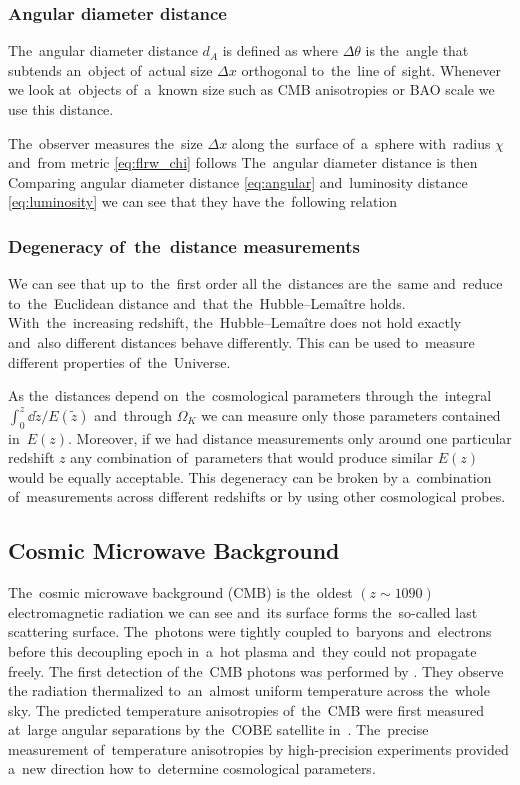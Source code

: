 \subsubsection{Angular diameter distance}
The~angular diameter distance $d_A$ is defined as \parencite{2010deto.book.....A}
where $\Delta\theta$ is the~angle that subtends an~object of~actual size $\Delta x$ orthogonal to~the~line of~sight. Whenever we look at~objects of~a~known size such as CMB anisotropies or BAO scale we use this distance.

The~observer measures the~size $\Delta x$ along the~surface of~a~sphere with~radius $\chi$ and~from metric \eqref{eq:flrw_chi} follows
The~angular diameter distance is then
Comparing angular diameter distance \eqref{eq:angular} and~luminosity distance \eqref{eq:luminosity} we can see that they have the~following relation
\subsubsection{Degeneracy of~the~distance measurements}
We can see that up to~the~first order all the~distances are the~same and~reduce to~the~Euclidean distance and~that the~Hubble--Lema\^{i}tre holds. With~the~increasing redshift, the~Hubble--Lema\^{i}tre does not hold exactly and~also different distances behave differently. This can be used to~measure different properties of~the~Universe.

As the~distances depend on~the~cosmological parameters through the~integral $\int_0^z{\dd\tilde z/E(\tilde z)}$ and~through $\Omega_K$ we can measure only those parameters contained in~$E(z)$. Moreover, if we had distance measurements only around one particular redshift $z$ any combination of~parameters that would produce similar $E(z)$ would be equally acceptable. This degeneracy can be broken by a~combination of~measurements across different redshifts or by using other cosmological probes. 
\subsection{Cosmic Microwave Background}
The~cosmic microwave background (CMB) is the~oldest $(z\sim1090)$ electromagnetic radiation we can see and~its surface forms the~so-called last scattering surface. The~photons were tightly coupled to~baryons and~electrons before this decoupling epoch in~a~hot plasma and~they could not propagate freely. The first detection of the~CMB photons was performed by \textcite{1965ApJ...142..419P}. They observe the radiation thermalized to~an~almost uniform temperature across the~whole sky. The predicted temperature anisotropies of~the~CMB were first measured at~large angular separations by the~COBE satellite in~\textcite{1992ApJ...396L...1S}. The~precise measurement of~temperature anisotropies by high-precision experiments \parencite[e.g.][]{2003ApJS..148..175S} provided a~new direction how to~determine cosmological parameters.

